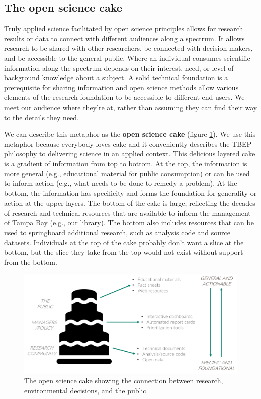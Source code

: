 \documentclass[
]{book}
\begin{document}
\hypertarget{the-open-science-cake}{%
\subsection{The open science cake}\label{the-open-science-cake}}

Truly applied science facilitated by open science principles allows for research results or data to connect with different audiences along a spectrum. It allows research to be shared with other researchers, be connected with decision-makers, and be accessible to the general public. Where an individual consumes scientific information along the spectrum depends on their interest, need, or level of background knowledge about a subject. A solid technical foundation is a prerequisite for sharing information and open science methods allow various elements of the research foundation to be accessible to different end users. We meet our audience where they're at, rather than assuming they can find their way to the details they need.

We can describe this metaphor as the \textbf{open science cake} (figure \ref{fig:cake}). We use this metaphor because everybody loves cake and it conveniently describes the TBEP philosophy to delivering science in an applied context. This delicious layered cake is a gradient of information from top to bottom. At the top, the information is more general (e.g., educational material for public consumption) or can be used to inform action (e.g., what needs to be done to remedy a problem). At the bottom, the information has specificity and forms the foundation for generality or action at the upper layers. The bottom of the cake is large, reflecting the decades of research and technical resources that are available to inform the management of Tampa Bay (e.g., our \href{http://tbep.org/library}{library}). The bottom also includes resources that can be used to springboard additional research, such as analysis code and source datasets. Individuals at the top of the cake probably don't want a slice at the bottom, but the slice they take from the top would not exist without support from the bottom.

\begin{figure}

{\centering \includegraphics[width=1\linewidth]{img/cake} 

}

\caption{The open science cake showing the connection between research, environmental decisions, and the public.}\label{fig:cake}
\end{figure}
\end{document}
